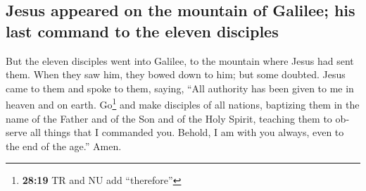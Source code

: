 \begin{paracol}{2}
\begin{otherlanguage}{english}
{\subsection{Jesus appeared on the mountain of Galilee; his last command
to the eleven
disciples}\label{jesus-appeared-on-the-mountain-of-galilee-his-last-command-to-the-eleven-disciples}}

 But the eleven disciples went into Galilee, to the
mountain where Jesus had sent them.  When they saw him,
they bowed down to him; but some doubted.  Jesus came to
them and spoke to them, saying, ``All authority has been given to me in
heaven and on earth.  Go\footnote{\textbf{28:19} TR and
  NU add ``therefore''} and make disciples of all nations, baptizing
them in the name of the Father and of the Son and of the Holy Spirit,
 teaching them to observe all things that I commanded
you. Behold, I am with you always, even to the end of the age.'' Amen.
\end{otherlanguage} \end{paracol}
